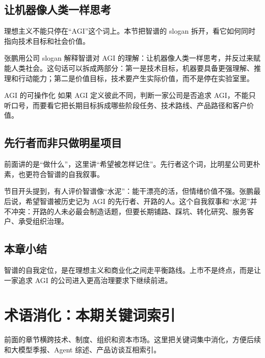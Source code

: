 \documentclass[a4paper]{article}
\begin{document}
\subsection{让机器像人类一样思考}

理想主义不能只停在“AGI”这个词上。本节把智谱的 slogan 拆开，看它如何同时指向技术目标和社会价值。

张鹏用公司 slogan 解释智谱对 AGI 的理解：让机器像人类一样思考，并反过来赋能人类社会。这句话可以拆成两部分：第一是技术目标，机器要具备更强理解、推理和行动能力；第二是价值目标，技术要产生实际价值，而不是停在实验室里。

\begin{importantbox}{AGI 的可操作化}
如果 AGI 定义彼此不同，判断一家公司是否追求 AGI，不能只听口号，而要看它把长期目标拆成哪些阶段任务、技术路线、产品路径和客户价值。
\end{importantbox}

\subsection{先行者而非只做明星项目}

前面讲的是“做什么”，这里讲“希望被怎样记住”。先行者这个词，比明星公司更朴素，也更符合智谱的自我叙事。

节目开头提到，有人评价智谱像“水泥”：能干漂亮的活，但情绪价值不强。张鹏最后说，希望智谱被历史记为 AGI 的先行者、开路的人。这个自我叙事和“水泥”并不冲突：开路的人未必最会制造话题，但要长期铺路、踩坑、转化研究、服务客户、承受组织治理。

\subsection{本章小结}

智谱的自我定位，是在理想主义和商业化之间走平衡路线。上市不是终点，而是让一家追求 AGI 的公司进入更高治理要求下继续前进。

\section{术语消化：本期关键词索引}

前面的章节横跨技术、制度、组织和资本市场。这里把关键词集中消化，方便后续和大模型季报、Agent 综述、产品访谈互相索引。
\end{document}

